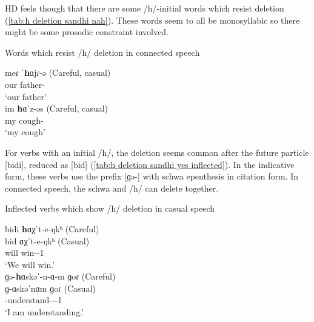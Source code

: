   	
  	
  	
  	
  	HD feels though that there are some /h/-initial words which resist deletion (\ref{tab:h deletion sandhi nah}). These words seem to all be monosyllabic so there might be some prosodic constraint involved. 
  	
  	
  	\begin{exe}
    \ex Words which resist /h/ deletion in connected speech \label{tab:h deletion sandhi nah}
    \begin{xlist}
    	\ex \gll meɾ ˈ\textbf{h}ɑjɾ-ə (Careful, casual)
    	\\
    	our father-{} 
    	\\
    	\trans `our father'
    	\\
    	\ex \gll im \textbf{h}ɑˈz-əs (Careful, casual)
    	\\
    	my cough-{\possFsg} 
    	\\
    	\trans `my cough'
    	\\
    \end{xlist}
  	\end{exe}
  	
  	
  	
  	
  	
  	For verbs with an initial /h/, the deletion seems common after the future particle [bidi], reduced as [bid] (\ref{tab:h deletion sandhi yes inflected}). In the indicative form, these verbs use the prefix [ɡə-] with schwa epenthesis in citation form. In connected speech, the schwa and /h/ can delete together. 
  	
  	
  	\begin{exe}
    \ex Inflected verbs which show /h/ deletion in casual speech \label{tab:h deletion sandhi yes inflected}
    \begin{xlist}
    	\ex \glll bidi \textbf{h}ɑχˈt-e-ŋkʰ (Careful)
    	\\
    	bid ɑχˈt-e-ŋkʰ (Casual)
    	\\
    	will win-{\thgloss}-1{\pl}
    	\\
    	\trans `We will win.'
    	\\
    	\ex \glll ɡə-\textbf{h}ɑskəˈ-n-ɑ-m ɡoɾ (Careful)
    	\\
    	ɡ-ɑskəˈnɑm ɡoɾ (Casual)
    	\\
    	{\ind}-understand-{\inch}-{\thgloss}-1{\sg} {\prog}
    	\\
    	\trans `I am understanding.'
    	\\
    \end{xlist}
  	\end{exe}
  	
